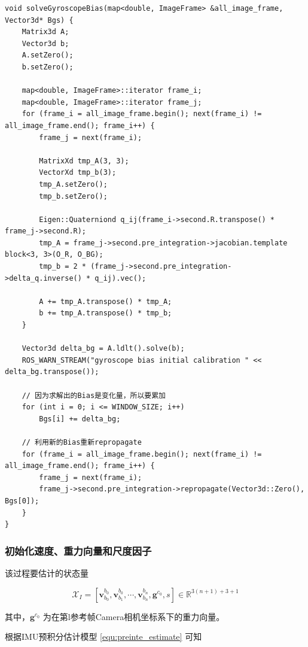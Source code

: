 \documentclass[12pt,a4paper]{article}
\begin{document}
\begin{lstlisting}
void solveGyroscopeBias(map<double, ImageFrame> &all_image_frame, Vector3d* Bgs) {
    Matrix3d A;
    Vector3d b;
    A.setZero();
    b.setZero();

    map<double, ImageFrame>::iterator frame_i;
    map<double, ImageFrame>::iterator frame_j;
    for (frame_i = all_image_frame.begin(); next(frame_i) != all_image_frame.end(); frame_i++) {
        frame_j = next(frame_i);

        MatrixXd tmp_A(3, 3);
        VectorXd tmp_b(3);
        tmp_A.setZero();
        tmp_b.setZero();

        Eigen::Quaterniond q_ij(frame_i->second.R.transpose() * frame_j->second.R);
        tmp_A = frame_j->second.pre_integration->jacobian.template block<3, 3>(O_R, O_BG);
        tmp_b = 2 * (frame_j->second.pre_integration->delta_q.inverse() * q_ij).vec();

        A += tmp_A.transpose() * tmp_A;
        b += tmp_A.transpose() * tmp_b;
    }

    Vector3d delta_bg = A.ldlt().solve(b);
    ROS_WARN_STREAM("gyroscope bias initial calibration " << delta_bg.transpose());

    // 因为求解出的Bias是变化量，所以要累加
    for (int i = 0; i <= WINDOW_SIZE; i++)
        Bgs[i] += delta_bg;

    // 利用新的Bias重新repropagate
    for (frame_i = all_image_frame.begin(); next(frame_i) != all_image_frame.end(); frame_i++) {
        frame_j = next(frame_i);
        frame_j->second.pre_integration->repropagate(Vector3d::Zero(), Bgs[0]);
    }
}
\end{lstlisting}

\subsubsection{初始化速度、重力向量和尺度因子}

该过程要估计的状态量

\begin{equation}
\mathcal{X}_{I}=
\left[
\mathbf{v}^{b_{0}}_{b_{0}}, \mathbf{v}^{b_{0}}_{b_{1}}, \cdots, \mathbf{v}^{b_{n}}_{b_{n}}, \mathbf{g}^{c_{0}}, s
\right]
\in \mathbb{R}^{3(n+1)+3+1}
\end{equation}

其中，$\mathbf{g}^{c_{0}}$ 为在第l参考帧Camera相机坐标系下的重力向量。

根据IMU预积分估计模型 \eqref{equ:preinte_estimate} 可知
\end{document}
